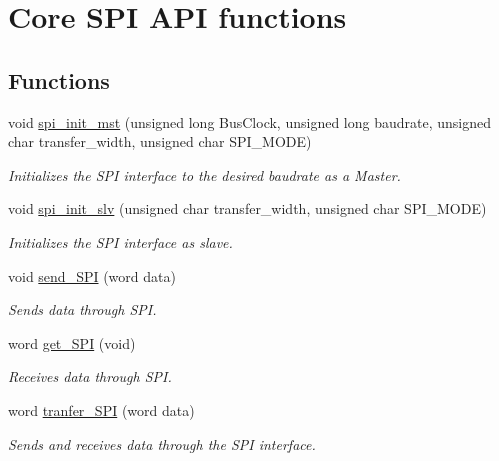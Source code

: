 \hypertarget{group___core_s_p_i}{}\section{Core S\+P\+I A\+P\+I functions}
\label{group___core_s_p_i}
\subsection*{Functions}
\begin{DoxyCompactItemize}
\item 
void \hyperlink{group___core_s_p_i_gab49ca6ed7d4337f79a4a46253a0bcc62}{spi\+\_\+init\+\_\+mst} (unsigned long Bus\+Clock, unsigned long baudrate, unsigned char transfer\+\_\+width, unsigned char S\+P\+I\+\_\+\+M\+O\+D\+E)
\begin{DoxyCompactList}\small\item\em Initializes the S\+P\+I interface to the desired baudrate as a Master. \end{DoxyCompactList}\item 
void \hyperlink{group___core_s_p_i_ga65cea3c951df80d515ad8de782eacdb8}{spi\+\_\+init\+\_\+slv} (unsigned char transfer\+\_\+width, unsigned char S\+P\+I\+\_\+\+M\+O\+D\+E)
\begin{DoxyCompactList}\small\item\em Initializes the S\+P\+I interface as slave. \end{DoxyCompactList}\item 
void \hyperlink{group___core_s_p_i_ga0ae24835498fe160774990423328cc41}{send\+\_\+\+S\+P\+I} (word data)
\begin{DoxyCompactList}\small\item\em Sends data through S\+P\+I. \end{DoxyCompactList}\item 
word \hyperlink{group___core_s_p_i_ga47ab469f1d05e31eab7814cab5123127}{get\+\_\+\+S\+P\+I} (void)
\begin{DoxyCompactList}\small\item\em Receives data through S\+P\+I. \end{DoxyCompactList}\item 
word \hyperlink{group___core_s_p_i_ga0161f7f2a3f5e77e2e71051bdfdcb856}{tranfer\+\_\+\+S\+P\+I} (word data)
\begin{DoxyCompactList}\small\item\em Sends and receives data through the S\+P\+I interface. \end{DoxyCompactList}\end{DoxyCompactItemize}


